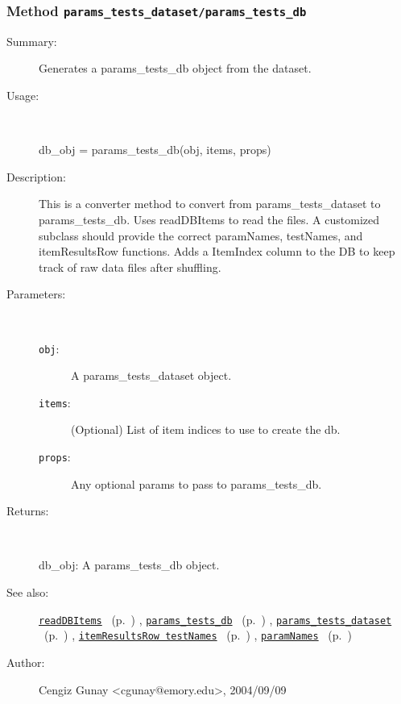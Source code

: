 \subsubsection[Method \texttt{params\_tests\_db}]{Method \texttt{params\_tests\_dataset/params\_tests\_db}}%
%
\label{ref_params_tests_dataset__params_tests_db}%
\hypertarget{ref_params_tests_dataset__params_tests_db}{}%
\begin{description}
\item[Summary:]Generates a params\_tests\_db object from the dataset.
%
\item[Usage:]~%
\begin{lyxcode}%
db\_obj = params\_tests\_db(obj, items, props)
%
\end{lyxcode}%
%
\item[Description:]%
This is a converter method to convert from params\_tests\_dataset to
 params\_tests\_db. Uses readDBItems to read the files.
 A customized subclass should provide the correct 
 paramNames, testNames, and itemResultsRow functions. Adds a ItemIndex
 column to the DB to keep track of raw data files after shuffling.
\item[Parameters:]~
\begin{description}%
\item[\texttt{obj}:]
 A params\_tests\_dataset object.
\item[\texttt{items}:]
 (Optional) List of item indices to use to create the db.
\item[\texttt{props}:]
 Any optional params to pass to params\_tests\_db.
\end{description}%
%
\item[Returns:
]~

	db\_obj: A params\_tests\_db object.
%
%
\item[See also:]%
\hyperlink{ref_readDBItems}{\texttt{readDBItems}}%
\ (p.~\pageref{ref_readDBItems})%
%
, \hyperlink{ref_params_tests_db}{\texttt{params\_tests\_db}}%
\ (p.~\pageref{ref_params_tests_db})%
%
, \hyperlink{ref_params_tests_dataset}{\texttt{params\_tests\_dataset}}%
\ (p.~\pageref{ref_params_tests_dataset})%
%
, \hyperlink{ref_itemResultsRow
	    testNames}{\texttt{itemResultsRow
	    testNames}}%
\ (p.~\pageref{ref_itemResultsRow
	    testNames})%
%
, \hyperlink{ref_paramNames}{\texttt{paramNames}}%
\ (p.~\pageref{ref_paramNames})%
%
%
\item[Author:]%
Cengiz Gunay <cgunay@emory.edu>, 2004/09/09
%
\end{description}
\methodline%
